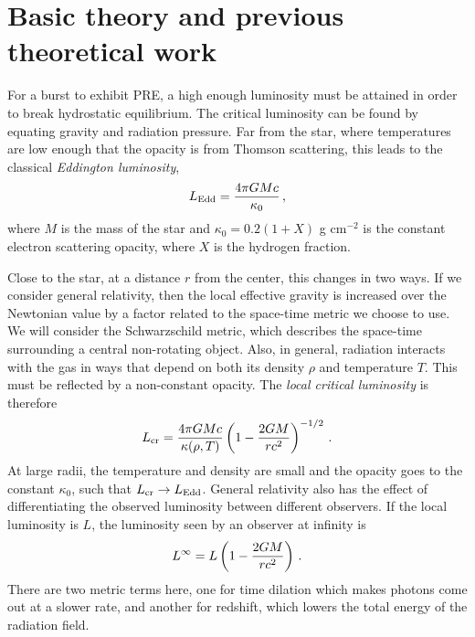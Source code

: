 \documentclass[../main.tex]{subfiles}
\begin{document}
\section{Basic theory and previous theoretical work}\label{section:basic_theory}
For a burst to exhibit PRE, a high enough luminosity must be attained in order to break hydrostatic equilibrium. The critical luminosity can be found by equating gravity and radiation pressure.  Far from the star, where temperatures are low enough that the opacity is from Thomson scattering, this leads to the classical \textit{Eddington luminosity},
\begin{equation}\label{eq:LEdd}
    L_\text{Edd} = \frac{4\pi GMc}{\kappa_0}\,,
\end{equation}
where $M$ is the mass of the star and $\kappa_0=0.2(1+X)$ g cm$^{-2}$ is the constant electron scattering opacity, where $X$ is the hydrogen fraction.

Close to the star, at a distance $r$ from the center, this changes in two ways. If we consider general relativity, then the local effective gravity is increased over the Newtonian value by a factor related to the space-time metric we choose to use. We will consider the Schwarzschild metric, which describes the space-time surrounding a central non-rotating object. Also, in general, radiation interacts with the gas in ways that depend on both its density $\rho$ and temperature $T$. This must be reflected by a non-constant opacity. The \textit{local critical luminosity} is therefore
\begin{equation}\label{eq:Lcrit}
    L_\text{cr}=\frac{4\pi GMc}{\kappa(\rho,T)}\left(1-\frac{2GM}{rc^2}\right)^{-1/2}\,.
\end{equation}
At large radii, the temperature and density are small and the opacity goes to the constant $\kappa_0$, such that $L_\text{cr}\rightarrow L_\text{Edd}$. General relativity also has the effect of differentiating the observed luminosity between different observers.  If the local luminosity is $L$, the luminosity seen by an observer at infinity is
\begin{equation}\label{eq:Linf}
    L^\infty=L\left(1-\frac{2GM}{rc^2}\right)\,.
\end{equation}
There are two metric terms here, one for time dilation which makes photons come out at a slower rate, and another for redshift, which lowers the total energy of the radiation field.  
\end{document}
